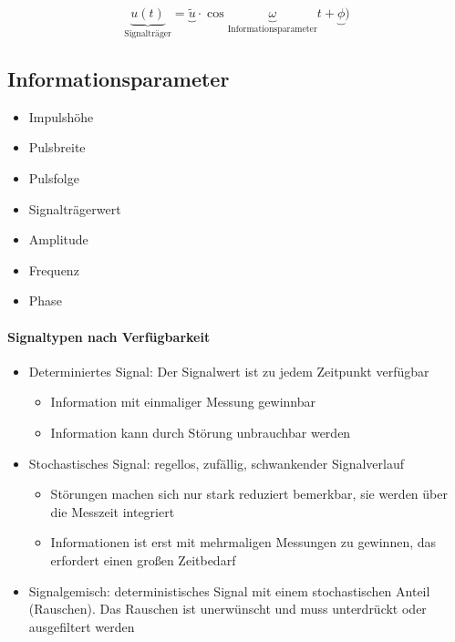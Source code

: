 \documentclass[a4paper]{scrartcl}
\begin{document}
\[ \underbrace{u(t)}_{\text{Signalträger}} = \underbrace{\tilde{u}} \cdot \cos{\underbrace{\omega}_{\text{Informationsparameter}} t + \underbrace{\phi}) }\]

\subsection{Informationsparameter}

\begin{itemize}
\item Impulshöhe
\item Pulsbreite
\item Pulsfolge
\item Signalträgerwert
\item Amplitude
\item Frequenz
\item Phase
\end{itemize}

\paragraph{Signaltypen nach Verfügbarkeit}
\begin{itemize}
\item Determiniertes Signal: Der Signalwert ist zu jedem Zeitpunkt verfügbar
    \begin{itemize}
    \item Information mit einmaliger Messung gewinnbar
    \item Information kann durch Störung unbrauchbar werden
    \end{itemize}
\item Stochastisches Signal: regellos, zufällig, schwankender Signalverlauf
    \begin{itemize}
    \item Störungen machen sich nur stark reduziert bemerkbar, sie werden über die Messzeit integriert
    \item Informationen ist erst mit mehrmaligen Messungen zu gewinnen, das erfordert einen großen Zeitbedarf
    \end{itemize}
\item Signalgemisch: deterministisches Signal mit einem stochastischen Anteil (Rauschen). Das Rauschen ist unerwünscht und muss unterdrückt oder ausgefiltert werden
\end{itemize}
\end{document}
